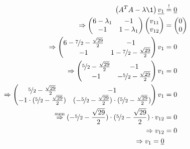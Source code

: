 \begin{equation}\begin{split}
	\left(A^TA-\lambda\1\right)\underline{v_1} &\stackrel{!}{=} \underline{0}\\
	\Rightarrow
	\begin{pmatrix}
		6-\lambda_1&-1\\-1&1-\lambda_1
	\end{pmatrix}
	\begin{pmatrix}
		v_{11}\\v_{12}
	\end{pmatrix}
	&=
	\begin{pmatrix}
		0\\0
	\end{pmatrix}\\
	\Rightarrow
	\begin{pmatrix}
		6-\nicefrac{7}{2} - \frac{\sqrt{29}}{2} & -1\\
		-1 & 1 -\nicefrac{7}{2} - \frac{\sqrt{29}}{2}
	\end{pmatrix}
	v_1
	&=
	0\\
	\Rightarrow
	\begin{pmatrix}
		\nicefrac{5}{2} - \frac{\sqrt{29}}{2} & -1\\
		-1 & -\nicefrac{5}{2} - \frac{\sqrt{29}}{2}
	\end{pmatrix}
	v_1
	&=
	0\\
	\Rightarrow
	\begin{pmatrix}
		\nicefrac{5}{2} - \frac{\sqrt{29}}{2} & -1\\
		-1 \cdot (\nicefrac{5}{2} - \frac{\sqrt{29}}{2}) & (-\nicefrac{5}{2} - \frac{\sqrt{29}}{2})\cdot(\nicefrac{5}{2} - \frac{\sqrt{29}}{2})
	\end{pmatrix}
	v_1
	&=
	0\\
	\stackrel{\text{sum}}{\Rightarrow}
	(-\nicefrac{5}{2} - \frac{\sqrt{29}}{2})\cdot(\nicefrac{5}{2} - \frac{\sqrt{29}}{2}) \cdot v_{12} &= 0\\
	\Rightarrow v_{12} &= 0\\
	\Rightarrow v_1 = \underline{0}
\end{split}\end{equation}
















